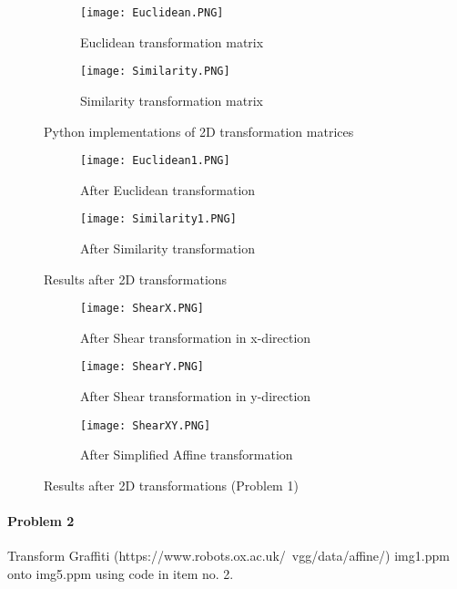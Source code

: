 \documentclass[11pt]{scrartcl}
\begin{document}
{\begin{figure}[H]
\centering
\begin{subfigure}{.5\textwidth}
  \centering
  \texttt{[image: Euclidean.PNG]}
  \caption{Euclidean transformation matrix}
  \label{fig:sub1}
\end{subfigure}%
\begin{subfigure}{0.5\textwidth}
  \centering
  \texttt{[image: Similarity.PNG]}
  \caption{Similarity transformation matrix}
  \label{fig:sub2}
\end{subfigure}
\caption{Python implementations of 2D transformation matrices}
\label{fig:test}
\end{figure}

\begin{figure}[h!]
\centering
\begin{subfigure}{.5\textwidth}
  \centering
  \texttt{[image: Euclidean1.PNG]}
  \caption{After Euclidean transformation}
  \label{fig:sub1}
\end{subfigure}%
\begin{subfigure}{0.5\textwidth}
  \centering
  \texttt{[image: Similarity1.PNG]}
  \caption{After Similarity transformation}
  \label{fig:sub2}
\end{subfigure}
\caption{Results after 2D transformations}
\label{fig:test}
\end{figure}

\begin{figure}[h!]
\centering
\begin{subfigure}{0.5\textwidth}
  \centering
  \texttt{[image: ShearX.PNG]}
  \caption{After Shear transformation in x-direction}
  \label{fig:sub2}
\end{subfigure}
\begin{subfigure}{0.4\textwidth}
  \centering
  \texttt{[image: ShearY.PNG]}
  \caption{After Shear transformation in y-direction}
  \label{fig:sub2}
\end{subfigure}
\begin{subfigure}{0.4\textwidth}
  \centering
  \texttt{[image: ShearXY.PNG]}
  \caption{After Simplified Affine transformation}
  \label{fig:sub2}
\end{subfigure}
\caption{Results after 2D transformations (Problem 1)}
\label{fig:test}
\end{figure}


\paragraph*{Problem 2}
Transform Graffiti (https://www.robots.ox.ac.uk/~vgg/data/affine/) img1.ppm onto img5.ppm
using code in item no. 2.

}
\end{document}
